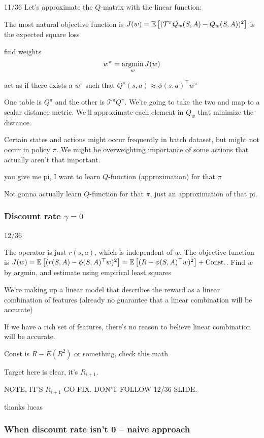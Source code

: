 \documentclass[11pt]{article}
\begin{document}
11/36
Let's approximate the $Q$-matrix with the linear function:

The most natural objective function is $J(w) = \mathbb{E}\left[ (\mathcal{T}^\pi Q_w(S,A) - Q_w(S,A))^2 \right]$ is the expected square loss

find weights $$w^\pi = \operatorname*{argmin}_w J(w)$$

act as if there exists a $w^\pi$ such that $Q^\pi(s, a) \approx \phi(s, a)^\top w^\pi$

One table is $Q^\pi$ and the other is $\mathcal{T}^\pi Q^\pi$. We're going to take the two and map to a scalar distance metric. We'll approximate each element in $Q_w$ that minimize the distance.

Certain states and actions might occur frequently in batch dataset, but might not occur in policy $\pi$. We might be overweighting importance of some actions that actually aren't that important.

you give me pi, I want to learn $Q$-function (approximation) for that $\pi$

Not gonna actually learn $Q$-function for that $\pi$, just an approximation of that pi.

\subsubsection{Discount rate $\gamma = 0$}
12/36
 
The operator is just $r(s,a)$, which is independent of $w$. The objective function is $J(w) = \mathbb{E}\left[ (r(S,A) - \phi(S,A)^\top w)^2 \right] = \mathbb{E}\left[ (R - \phi(S,A)^\top w)^2 \right] + \text{Const.}$. Find $w$ by argmin, and estimate using empirical least squares

We're making up a linear model that describes the reward as a linear combination of features (already no guarantee that a linear combination will be accurate)

If we have a rich set of features, there's no reason to believe linear combination will be accurate.

Const is $R - E(R^2)$ or something, check this math

Target here is clear, it's $R_{i+1}$.

NOTE, IT'S $R_{i + 1}$ GO FIX. DON'T FOLLOW 12/36 SLIDE.

thanks lucas

\subsubsection{When discount rate isn't 0 -- naive approach}
\end{document}
